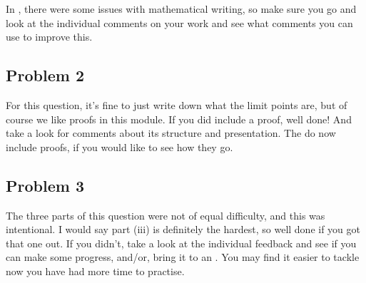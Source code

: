 \documentclass[letterpaper,10pt,english]{jupyterBook}
\begin{document}
\sphinxAtStartPar
In {\hyperref[\detokenize{Problems:p2}]{}}, there were some issues with mathematical writing, so make sure you go and look at the individual comments on your work and see what comments you can use to improve this.


\subsection{Problem 2}
\label{\detokenize{HW-feedback:problem-2}}
\sphinxAtStartPar
For this question, it’s fine to just write down what the limit points are, but of course we like proofs in this module. If you did include a proof, well done! And take a look for comments about its structure and presentation. The {\hyperref[\detokenize{Solutions-upto46:id1}]{}} do now include proofs, if you would like to see how they go.


\subsection{Problem 3}
\label{\detokenize{HW-feedback:problem-3}}
\sphinxAtStartPar
The three parts of this question were not of equal difficulty, and this was intentional. I would say part (iii) is definitely the hardest, so well done if you got that one out. If you didn’t, take a look at the individual feedback and see if you can make some progress, and/or, bring it to an . You may find it easier to tackle now you have had more time to practise.
\end{document}
